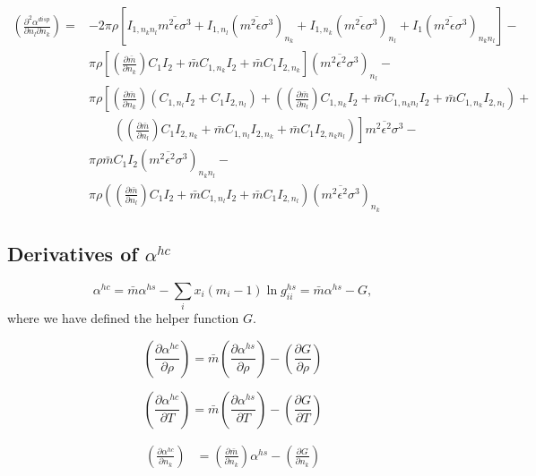 \documentclass[internal,english]{sintefmemo2012}
\newcommand*{\pder}[2]{\left(\frac{\partial #1}{\partial #2}\right)}
\newcommand*{\pdcross}[3]{\left(\frac{\partial^2 #1}{\partial #2 \partial #3}\right)}
\begin{document}
\begin{equation}
  \begin{aligned} %
    \pdcross{\alpha^{disp}}{n_l}{n_k} =& -2 \pi \rho \left[ I_{1,n_k n_l} \overline{m^2 \epsilon \sigma^3} + I_{1,n_l} (\overline{m^2 \epsilon \sigma^3})_{n_k} + I_{1,n_k} (\overline{m^2 \epsilon \sigma^3})_{n_l} + I_1 (\overline{m^2 \epsilon \sigma^3})_{n_k n_l} \right] -\\
    & \pi \rho \left[ \pder{\bar m}{n_k} C_1 I_2 + \bar m C_{1,n_k} I_2 + \bar m C_1 I_{2,n_k} \right] (\overline{m^2 \epsilon^2 \sigma^3})_{n_l} -\\
    & \pi \rho \left[ \pder{\bar m}{n_k} (C_{1,n_l} I_2 + C_1 I_{2,n_l}) + (\pder{\bar m}{n_l} C_{1,n_k} I_2 + \bar m C_{1,n_k n_l} I_2 + \bar m C_{1,n_k} I_{2,n_l}) + \right. \\
    & \qquad \left. (\pder{\bar m}{n_l} C_1 I_{2,n_k} + \bar m C_{1,n_l} I_{2,n_k} + \bar m C_1 I_{2,n_k n_l}) \right] \overline{m^2 \epsilon^2 \sigma^3} -\\
    & \pi \rho \bar m C_1 I_2 (\overline{m^2 \epsilon^2 \sigma^3})_{n_k n_l} - \\
    & \pi \rho (\pder{\bar m}{n_l} C_1 I_2 + \bar m C_{1,n_l} I_2 + \bar m C_1 I_{2,n_l}) (\overline{m^2 \epsilon^2 \sigma^3})_{n_k}
  \end{aligned}
\end{equation}

\subsection{Derivatives of $\alpha^{hc}$}
\begin{equation}
  \alpha^{hc} = \bar m \alpha^{hs} - \sum_i x_i(m_i-1)\ln g_{ii}^{hs} = \bar m \alpha^{hs} - G,
\end{equation}
where we have defined the helper function $G$.

\begin{equation}
  \pder{\alpha^{hc}}{\rho} = \bar m \pder{\alpha^{hs}}{\rho} - \pder{G}{\rho}
\end{equation}

\begin{equation}
  \pder{\alpha^{hc}}{T} = \bar m \pder{\alpha^{hs}}{T} - \pder{G}{T}
\end{equation}

\begin{equation}
  \begin{aligned}
      \pder{\alpha^{hc}}{n_k} &= \pder{\bar m}{n_k} \alpha^{hs} - \pder{G}{n_k}
    \end{aligned}
\end{equation}
\end{document}
